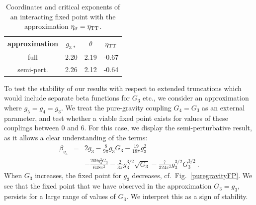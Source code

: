 \documentclass[twocolumn,prd,superscriptaddress,preprintnumbers,amsmath,amssymb,nofootinbib]{revtex4}
\newcommand{\bea}{\begin{eqnarray}}
\newcommand{\eea}{\end{eqnarray}}
\begin{document}
\begin{table}[!here]
\begin{tabular}{cccc}
approximation&$g_{3\,\ast}$& $\theta$& $\eta_{\rm TT}$\\ \hline \hline
full & 2.20 & 2.19 & -0.67 \\\hline
semi-pert.&2.26 & 2.12 & -0.64 \\ \hline\hline
\end{tabular}
\caption{\label{puregravityFPetaapprox}Coordinates and critical exponents of an interacting fixed point with the approximation $\eta_{\sigma} = \eta_{\rm TT}$.}
\end{table} 

To test the stability of our results with respect to extended truncations which would include separate beta functions for $G_3$ etc., we consider an approximation where $g_5=g_4=g_3$. We treat the pure-gravity coupling $G_4=G_3$ as an external parameter, and test whether a viable fixed point exists for values of these couplings between 0 and 6. 
For this case, we display the semi-perturbative result, as it allows a clear understanding of the terms:
\bea
\beta_{g_3} &=&2 g_3 - \frac{8}{9 \pi} g_3 G_3 
- \frac{19}{18 \pi}g_3^2
\\
&{}& - \frac{209 g_3^2 G_3}{648 \pi^2} 
- \frac{2}{3 \pi}g_3^{3/2}\sqrt{G_3}
- \frac{7}{324 \pi^2}g_3^{3/2}G_3^{3/2}\ .
\nonumber
\eea
When $G_3$ increases, the fixed point for $g_3$ decreases,
cf.~Fig.~\ref{puregravityFP}. 
We see that the fixed point that we have observed in the approximation $G_3=g_3$, persists for a large range of values of $G_3$.
We interpret this as a sign of stability.
\end{document}
